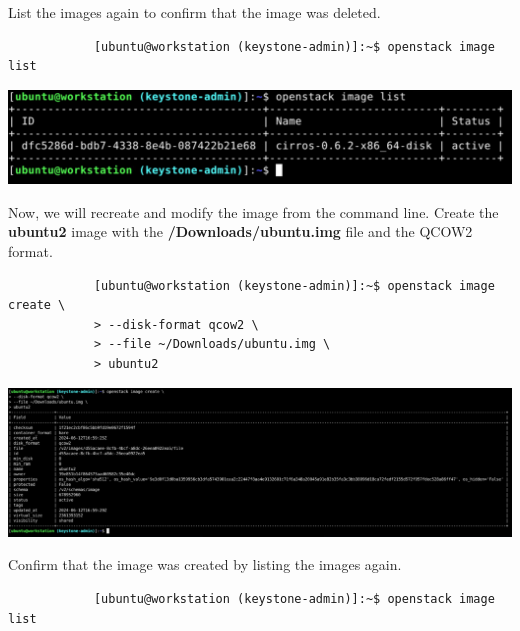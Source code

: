 \documentclass[letterpaper, 12pt]{article}
\begin{document}
\begin{enumerate}
    \begin{labstep}
        List the images again to confirm that the image was deleted.
        \begin{lstlisting}
            [ubuntu@workstation (keystone-admin)]:~$ openstack image list
        \end{lstlisting}

        \begin{center}
            \includegraphics[width=\linewidth]{images/part1/step18.png}
        \end{center}
    \end{labstep}

    \begin{labstep}
        Now, we will recreate and modify the image from the command line.
        Create the \textbf{ubuntu2} image with the \textbf{\texttildemid/Downloads/ubuntu.img} file and the QCOW2 format.
        \begin{lstlisting}
            [ubuntu@workstation (keystone-admin)]:~$ openstack image create \
            > --disk-format qcow2 \
            > --file ~/Downloads/ubuntu.img \
            > ubuntu2
        \end{lstlisting}

        \begin{center}
            \includegraphics[width=\linewidth]{images/part1/step19.png}
        \end{center}
    \end{labstep}

    \begin{labstep}
        Confirm that the image was created by listing the images again.
        \begin{lstlisting}
            [ubuntu@workstation (keystone-admin)]:~$ openstack image list
        \end{lstlisting}


\end{labstep}
\end{enumerate}
\end{document}
